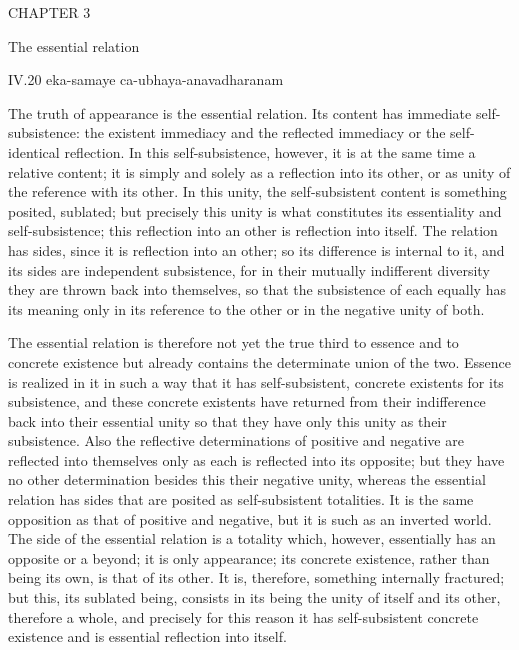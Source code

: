 CHAPTER 3

The essential relation

IV.20
eka-samaye ca-ubhaya-anavadharanam

The truth of appearance is the essential relation.
Its content has immediate self-subsistence:
the existent immediacy and the reflected immediacy
or the self-identical reflection.
In this self-subsistence, however,
it is at the same time a relative content;
it is simply and solely as a reflection into its other,
or as unity of the reference with its other.
In this unity, the self-subsistent content is
something posited, sublated;
but precisely this unity is what constitutes
its essentiality and self-subsistence;
this reflection into an other is reflection into itself.
The relation has sides, since it is reflection into an other;
so its difference is internal to it,
and its sides are independent subsistence,
for in their mutually indifferent diversity
they are thrown back into themselves,
so that the subsistence of each equally has its meaning
only in its reference to the other
or in the negative unity of both.

The essential relation is therefore not yet
the true third to essence and to concrete existence
but already contains the determinate union of the two.
Essence is realized in it in such a way that
it has self-subsistent, concrete existents for its subsistence,
and these concrete existents have returned
from their indifference back into their essential unity
so that they have only this unity as their subsistence.
Also the reflective determinations
of positive and negative are
reflected into themselves only as
each is reflected into its opposite;
but they have no other determination
besides this their negative unity,
whereas the essential relation has sides
that are posited as self-subsistent totalities.
It is the same opposition as that of positive and negative,
but it is such as an inverted world.
The side of the essential relation is a totality
which, however, essentially has an opposite or a beyond;
it is only appearance;
its concrete existence,
rather than being its own,
is that of its other.
It is, therefore, something internally fractured;
but this, its sublated being, consists in
its being the unity of itself and its other,
therefore a whole, and precisely for this reason
it has self-subsistent concrete existence
and is essential reflection into itself.


